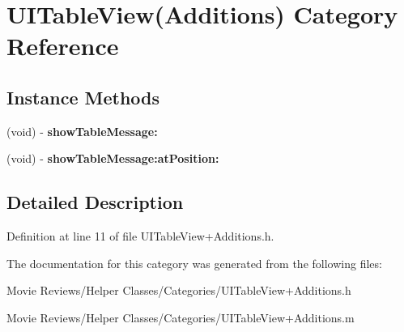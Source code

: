\section{U\+I\+Table\+View(Additions) Category Reference}
\label{category_u_i_table_view_07_additions_08}
\subsection*{Instance Methods}
\begin{DoxyCompactItemize}
\item 
(void) -\/ {\bfseries show\+Table\+Message\+:}\label{category_u_i_table_view_07_additions_08_a314173744308327c5e011d30f664e38f}

\item 
(void) -\/ {\bfseries show\+Table\+Message\+:at\+Position\+:}\label{category_u_i_table_view_07_additions_08_a7694212a4f8dba989a586c9f2ed786b7}

\end{DoxyCompactItemize}


\subsection{Detailed Description}


Definition at line 11 of file U\+I\+Table\+View+\+Additions.\+h.



The documentation for this category was generated from the following files\+:\begin{DoxyCompactItemize}
\item 
Movie Reviews/\+Helper Classes/\+Categories/U\+I\+Table\+View+\+Additions.\+h\item 
Movie Reviews/\+Helper Classes/\+Categories/U\+I\+Table\+View+\+Additions.\+m\end{DoxyCompactItemize}
